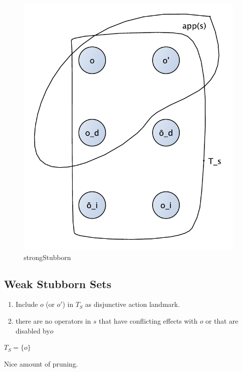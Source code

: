 \documentclass[11pt,a4paper]{article}
\begin{document}
\begin{figure}[h!]
\centering
\includegraphics[scale=0.4]{strongStubborn}
\caption{strongStubborn}
\end{figure}

\subsection*{Weak Stubborn Sets}
\begin{enumerate}
\item Include $o$ (or $o'$) in $T_S$ as disjunctive action landmark.
\item there are no operators in $s$ that have conflicting effects with $o$ or that are disabled by$o$
\end{enumerate}
$T_S = \{o\} $

Nice amount of pruning.
\end{document}
